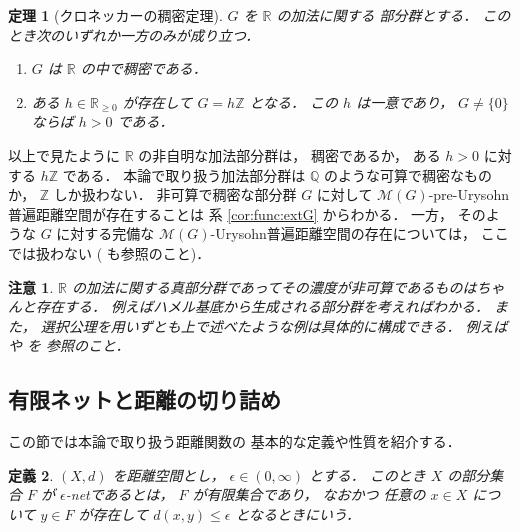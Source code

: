 \documentclass[leqno, 12pt]{jsarticle}
\newtheorem{thm}{定理}[section]
\newtheorem{df}[thm]{定義}
\newtheorem*{rmk}{注意}
\newcommand{\zz}{\mathbb{Z}}
\renewcommand{\qq}{\mathbb{Q}}
\newcommand{\rr}{\mathbb{R}}
\newcommand{\Met}[1]{\mathscr{M}(#1)}
\begin{document}
\begin{thm}[クロネッカーの稠密定理]\label{thm:hanasi:gr}
$G$
を
$\rr$
の加法に関する
部分群とする．
このとき次のいずれか一方のみが成り立つ．
\begin{enumerate}[label=\textup{(\arabic*)}]
\item
$G$
は
$\rr$
の中で稠密である．


\item
ある
$h\in \rr_{\ge 0}$
が存在して
$G=h\zz$
となる．
この
$h$
は一意であり，
$G\neq\{0\}$
ならば
$h>0$
である．
\end{enumerate}
\end{thm}
以上で見たように
$\rr$
の非自明な加法部分群は，
稠密であるか，
ある
$h>0$
に対する
$h\zz$
である．
本論で取り扱う加法部分群は
$\qq$
のような可算で稠密なものか，
$\zz$
しか扱わない．
非可算で稠密な部分群
$G$
に対して
$\Met{G}$-pre-Urysohn普遍距離空間が存在することは
系
\ref{cor:func:extG}
からわかる．
一方，
そのような
$G$
に対する完備な
$\Met{G}$-Urysohn普遍距離空間の存在については，
ここでは扱わない
(\cite{Sau}
も参照のこと)．

\begin{rmk}\label{rmk:preliminaries:uncountable-subgroups}
$\rr$
の加法に関する真部分群であってその濃度が非可算であるものはちゃんと存在する．
例えばハメル基底から生成される部分群を考えればわかる．
また，%
選択公理を用いずとも上で述べたような例は具体的に構成できる．
例えば
\cite{Neumann}
や
\cite{Mathoverflow}
を
参照のこと．
\end{rmk}


\subsection{有限ネットと距離の切り詰め}\label{subsec:preliminaries:finite-nets}
この節では本論で取り扱う距離関数の
基本的な定義や性質を紹介する．

\begin{df}\label{df:hanasi:net}
$(X, d)$
を距離空間とし，
$\epsilon \in (0, \infty)$
とする．
このとき
$X$
の部分集合
$F$
が
$\epsilon$-netであるとは，
$F$
が有限集合であり，
なおかつ
任意の
$x\in X$
について
$y\in F$
が存在して
$d(x, y)\le \epsilon$
となるときにいう．
\end{df}
\end{document}

